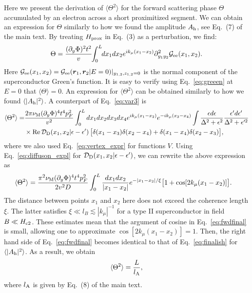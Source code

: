 \documentclass[pra,aps,a4paper,twocolumn,superscriptaddress,longbibliography]{revtex4-2}
\newcommand{\difz}{{\cal D}_{\rm D}}
\newcommand{\lprox}{L}
\newcommand{\kf}{k_\mu}
\newcommand{\lA}{l_{\rm A}}
\newcommand{\he}{A_{\rm h}}
\newcommand{\xic}{\xi}
\begin{document}
Here we present the derivation of $\langle\Theta^2\rangle$ for the forward scattering phase $\Theta$ accumulated by an electron across a short proximitized segment.
We can obtain an expression for $\Theta$ similarly to how we found the amplitude $\he$, see Eq.~(7) of the main text. By treating $H_{\rm prox}$ in Eq.~(3) as a perturbation, we find:
\begin{equation}
    \Theta = \frac{(\partial_y \Phi)^2 t^2}{v}\hspace{-0.1cm}\int_0^\lprox \hspace{-0.1cm} dx_1 dx_2 e^{i\kf (x_1 - x_2)}\partial^2_{y_1 y_2}{\cal G}_{\rm ee} (x_1, x_2).\label{eq:amplitudes2}
\end{equation}
Here ${\cal G}_{\rm ee}(x_1, x_2) = {\cal G}_{\rm ee}(\bm r_1, \bm r_2 | E = 0)|_{y_{1,2}, z_{1,2} = 0}$ is the normal component of the superconductor Green's function. 
It is easy to verify using Eq.~\eqref{eq:greeen} at $E = 0$ that $\langle \Theta \rangle = 0$.
An expression for $\langle \Theta^2 \rangle$ can be obtained similarly to how we found $\langle |\he|^2\rangle$. A counterpart of Eq.~\eqref{eq:var3} is 
\begin{align}
     \langle \Theta^2 \rangle = &\frac{2\pi \nu_{\rm M}(\partial_y \Phi)^4 t^4 p_F^2}{v^2}\int^{\lprox}_{0} dx_{1}dx_{2}dx_{3}dx_{4}e^{ik_\mu(x_1 -x_2)}e^{-ik_\mu(x_3 - x_4)}\int \frac{\epsilon d\epsilon}{\Delta^2 +\epsilon^2} \frac{\epsilon^\prime d\epsilon^\prime}{\Delta^2+\epsilon^{\prime 2}} \notag\\
    &\times{\rm Re}\,{\difz}(x_1,x_2|\epsilon - \epsilon^\prime)\,\big[\delta(x_1 -x_3) \delta(x_2-x_4) + \delta(x_1 -x_4)\delta(x_2-x_3)\big],
\end{align}
where we also used Eq.~\eqref{eq:vertex_expr} for functions $V$. 
Using Eq.~\eqref{eq:diffuson_expl} for ${\difz}(x_1,x_2|\epsilon - \epsilon^\prime)$, we can rewrite the above expression as
\begin{align}
    \langle \Theta^2 \rangle &= \frac{\pi^2 \nu_{\rm M}(\partial_y \Phi)^4 t^4 p_F^2}{2v^2 D} \int^{\lprox}_{0} \frac{dx_{1}dx_{2}}{|x_1 - x_2|}e^{-|x_1-x_2|/\xic} \big[1 + \cos[2k_{\mu} (x_1 - x_2)]\big].\label{eq:fwdfinal}
\end{align}
The distance between points $x_1$ and $x_2$ here does not exceed the coherence length $\xic$. The latter satisfies $\xic \ll l_B \lesssim |k_\mu|^{-1}$ for a type II superconductor in field $B \ll H_{\rm c2}$. These estimates mean that the argument of cosine in Eq.~\eqref{eq:fwdfinal} is small, allowing one to approximate $\cos[2k_\mu (x_1 - x_2)] = 1$. Then, the right hand side of Eq.~\eqref{eq:fwdfinal} becomes identical to that of Eq.~\eqref{eq:finalish} for $\langle |\he|^2\rangle$. As a result, we obtain
\begin{equation}\label{eq:Theta}
    \langle \Theta^2 \rangle = \frac{\lprox}{\lA},
\end{equation}
where $\lA$ is given by Eq.~(8) of the main text. 
\end{document}
